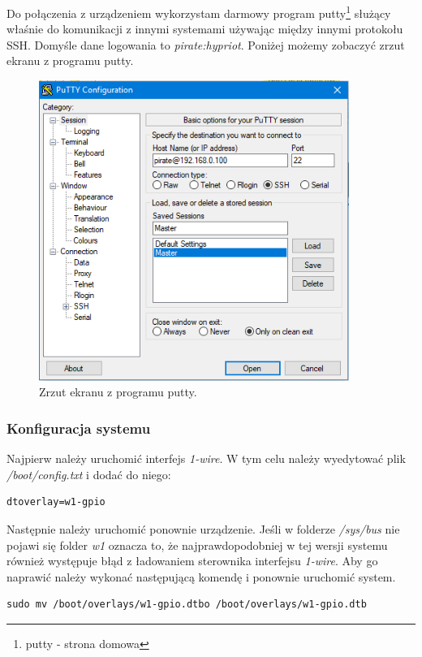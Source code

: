 \documentclass[12pt]{report}
\let\Oldsubsubsection\subsubsection
\renewcommand{\subsubsection}{\FloatBarrier\Oldsubsubsection}
\begin{document}
{Do połączenia z urządzeniem wykorzystam darmowy program putty\footnote{putty - strona domowa} służący właśnie do komunikacji z innymi systemami używając między innymi protokołu SSH. Domyśle dane logowania to \textit{pirate:hypriot}. Poniżej możemy zobaczyć zrzut ekranu z programu putty.

\begin{figure}[h]
	\centering
	\includegraphics[width=0.9\textwidth]{images/putty.png}
	\caption{Zrzut ekranu z programu putty.}
\end{figure}
\FloatBarrier

\subsubsection{Konfiguracja systemu}
Najpierw należy uruchomić interfejs \textit{1-wire}. W tym celu należy wyedytować plik \textit{/boot/config.txt} i dodać do niego:

\begin{lstlisting}
dtoverlay=w1-gpio
\end{lstlisting}

Następnie należy uruchomić ponownie urządzenie. Jeśli w folderze \textit{/sys/bus} nie pojawi się folder \textit{w1} oznacza to, że najprawdopodobniej w tej wersji systemu również występuje błąd z ładowaniem sterownika interfejsu \textit{1-wire}. Aby go naprawić należy wykonać następującą komendę i ponownie uruchomić system.

\begin{lstlisting}
sudo mv /boot/overlays/w1-gpio.dtbo	/boot/overlays/w1-gpio.dtb
\end{lstlisting}

}
\end{document}
